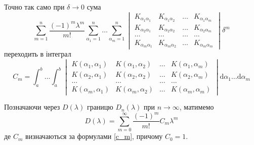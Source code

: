 \documentclass[14pt,twoside]{extreport}
\theoremstyle{mystyle}
\numberwithin{equation}{chapter}
\begin{document}
Точно так само при $\delta \to 0$ сума
\[
 \sum\limits_{m=1}^{n}\dfrac{(-1)^m\lambda^m}{m!}\sum\limits_{\alpha_1=1}^{n}\ldots\sum\limits_{\alpha_m=1}^{n}
\begin{vmatrix}
K_{\alpha_1\alpha_1} & K_{\alpha_1\alpha_2} & \ldots & K_{\alpha_1\alpha_m}\\
K_{\alpha_2\alpha_1} & K_{\alpha_2\alpha_2} & \ldots & K_{\alpha_2\alpha_m}\\
\ldots & \ldots & \ldots & \ldots\\
K_{\alpha_m\alpha_1} & K_{\alpha_m\alpha_2} & \ldots & K_{\alpha_m\alpha_m}
\end{vmatrix}\delta^m
\]
переходить в інтеграл
\begin{equation}\label{c_m}
C_m = \int_{a}^{b}\ldots \int_{a}^{b}
\begin{vmatrix}
K(\alpha_1, \alpha_1) & K(\alpha_1, \alpha_2) & \ldots & K(\alpha_1, \alpha_m)\\
K(\alpha_2, \alpha_1) & K(\alpha_2, \alpha_2) & \ldots & K(\alpha_2, \alpha_m)\\
\ldots & \ldots & \ldots & \ldots\\
K(\alpha_m, \alpha_1) & K(\alpha_m, \alpha_2) & \ldots & K(\alpha_m, \alpha_m)
\end{vmatrix}\mathrm{d}\alpha_1\ldots\mathrm{d}\alpha_m
\end{equation}

Позначаючи через $D(\lambda)$ границю $D_n(\lambda)$ при $n \to \infty$, матимемо
\begin{equation}\label{dser}
 D(\lambda)=\sum_{m=0}^{\infty}\frac{(-1)^{m}}{m!}C_{m}\lambda^{m}
\end{equation}
де $C_m$ визначаються за формулами \eqref{c_m}, причому $C_0 = 1$.
\end{document}

